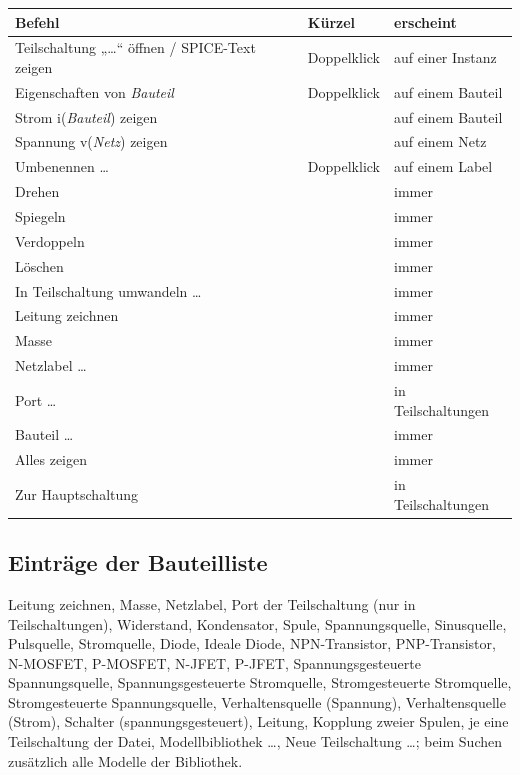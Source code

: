 \begin{longtable}{@{}P{6.6cm}P{2.6cm}P{4.6cm}@{}}
  \toprule
  Befehl & Kürzel & erscheint \\
  \midrule
  \endhead
  \bottomrule
  \endfoot
  Teilschaltung „…“ öffnen / SPICE-Text zeigen & Doppelklick & auf einer Instanz \\
  Eigenschaften von \textit{Bauteil} & Doppelklick & auf einem Bauteil \\
  Strom i(\textit{Bauteil}) zeigen &  & auf einem Bauteil \\
  Spannung v(\textit{Netz}) zeigen &  & auf einem Netz \\
  Umbenennen \dots & Doppelklick & auf einem Label \\
  Drehen &  & immer \\
  Spiegeln &  & immer \\
  Verdoppeln &  & immer \\
  Löschen &  & immer \\
  In Teilschaltung umwandeln \dots &  & immer \\
  Leitung zeichnen &  & immer \\
  Masse &  & immer \\
  Netzlabel \dots &  & immer \\
  Port \dots &  & in Teilschaltungen \\
  Bauteil \dots &  & immer \\
  Alles zeigen &  & immer \\
  Zur Hauptschaltung &  & in Teilschaltungen \\
\end{longtable}

\subsection*{Einträge der Bauteilliste}

Leitung zeichnen, Masse, Netzlabel, Port der Teilschaltung (nur in
Teilschaltungen), Widerstand, Kondensator, Spule, Spannungsquelle,
Sinusquelle, Pulsquelle, Stromquelle, Diode, Ideale Diode, NPN-Transistor,
PNP-Transistor, N-MOSFET, P-MOSFET, N-JFET, P-JFET, Spannungsgesteuerte
Spannungsquelle, Spannungsgesteuerte Stromquelle, Stromgesteuerte
Stromquelle, Stromgesteuerte Spannungsquelle, Verhaltensquelle (Spannung),
Verhaltensquelle (Strom), Schalter (spannungsgesteuert), Leitung, Kopplung
zweier Spulen, je eine Teilschaltung der Datei, Modellbibliothek \dots, Neue
Teilschaltung \dots; beim Suchen zusätzlich alle Modelle der Bibliothek.

